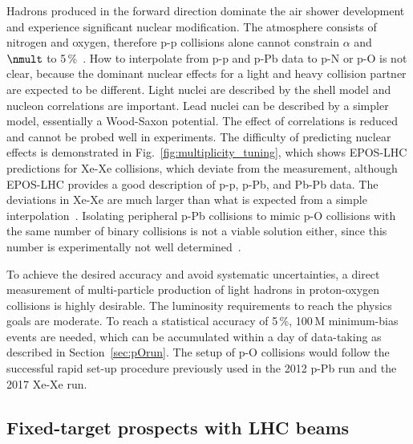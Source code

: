 \documentclass[../report.tex]{subfiles}
\begin{document}
Hadrons produced in the forward direction dominate the air shower development and experience significant nuclear modification\cite{Aaij:2017cqq}. The atmosphere consists of nitrogen and oxygen, therefore p-p collisions alone cannot constrain $\alpha$ and $\nmult$ to 5\,\%~\cite{dEnterria:2018kcz}. How to interpolate from p-p and p-Pb data to p-N or p-O is not clear, because the dominant nuclear effects for a light and heavy collision partner are expected to be different. Light nuclei are described by the shell model and nucleon correlations are important. Lead nuclei can be described by a simpler model, essentially a Wood-Saxon potential. The effect of correlations is reduced and cannot be probed well in experiments.
The difficulty of predicting nuclear effects is demonstrated in Fig.~\ref{fig:multiplicity_tuning}, which shows EPOS-LHC predictions for Xe-Xe collisions, which deviate from the measurement, although EPOS-LHC provides a good description of p-p, p-Pb, and Pb-Pb data. The deviations in Xe-Xe are much larger than what is expected from a simple interpolation~\cite{Kim:2018ink}. Isolating peripheral p-Pb collisions to mimic p-O collisions with the same number of binary collisions is not a viable solution either, since this number is experimentally not well determined~\cite{Toia:2014wia}.

To achieve the desired accuracy and avoid systematic uncertainties, a direct measurement of multi-particle production of light hadrons in proton-oxygen collisions is highly desirable. The luminosity requirements to reach the physics goals are moderate. To reach a statistical accuracy of 5\,\%, 100\,M minimum-bias events are needed, which can be accumulated within a day of data-taking as described in Section~\ref{sec:pOrun}. The setup of p-O collisions would follow the successful rapid set-up procedure previously used in the 2012 p-Pb run and the 2017 Xe-Xe run.

\subsection{Fixed-target prospects with LHC beams}
\label{sec:fixedtarget}
\end{document}
